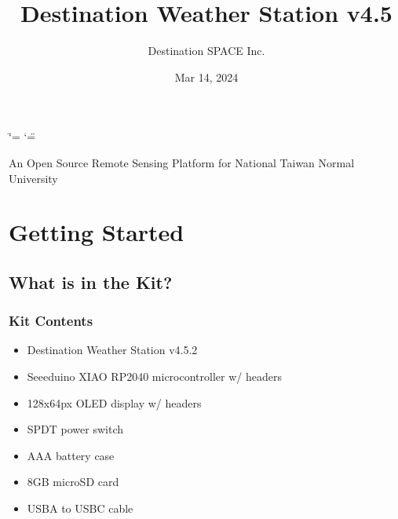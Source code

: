 \documentclass[letterpaper,10pt,english]{sphinxmanual}
\title{Destination Weather Station v4.5}
\date{Mar 14, 2024}
\author{Destination SPACE Inc.\@{}}
\begin{document}
\ifdefined\shorthandoff
  \ifnum\catcode`\=\string=\active\shorthandoff{=}\fi
  \ifnum\catcode`\"=\active{}\fi
\fi

\pagestyle{empty}
\sphinxmaketitle
\pagestyle{plain}
\sphinxtableofcontents
\pagestyle{normal}
\label{\detokenize{index::doc}}


\sphinxAtStartPar
An Open Source Remote Sensing Platform for National Taiwan Normal University



\chapter{Getting Started}
\label{\detokenize{index:getting-started}}
\sphinxstepscope


\section{What is in the Kit?}
\label{\detokenize{hardware/the-kit:what-is-in-the-kit}}\label{\detokenize{hardware/the-kit:the-kit}}\label{\detokenize{hardware/the-kit::doc}}

\subsection{Kit Contents}
\label{\detokenize{hardware/the-kit:kit-contents}}\begin{itemize}
\item {} 
\sphinxAtStartPar
Destination Weather Station v4.5.2

\item {} 
\sphinxAtStartPar
Seeeduino XIAO RP2040 microcontroller w/ headers

\item {} 
\sphinxAtStartPar
128x64px OLED display w/ headers

\item {} 
\sphinxAtStartPar
SPDT power switch

\item {} 
\sphinxAtStartPar
AAA battery case

\item {} 
\sphinxAtStartPar
8GB micro\sphinxhyphen{}SD card

\item {} 
\sphinxAtStartPar
USB\sphinxhyphen{}A to USB\sphinxhyphen{}C cable

\end{itemize}
\end{document}
